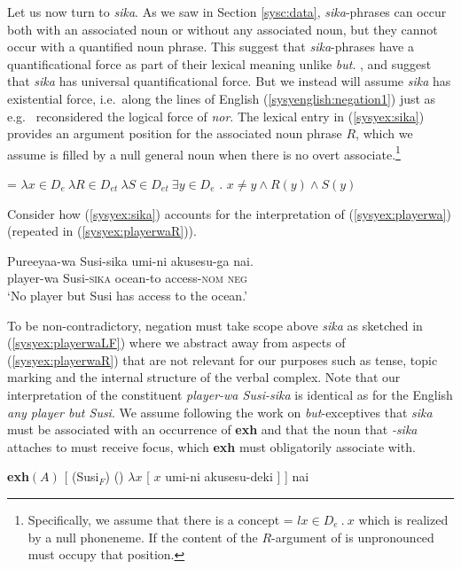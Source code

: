 \documentclass[output=paper,colorlinks,citecolor=brown,
]{langscibook}
\let\l\lambda
\def\refp#1{(\ref{sy#1})}
\def\M#1{\textsc{#1}}
\begin{document}
Let us now turn to \emph{sika}.  As we saw in Section \ref{sysc:data}, \emph{sika}-phrases can occur both with an associated noun or without any associated noun, but they cannot occur with a quantified noun phrase.
This suggest that \emph{sika}-phrases have a quantificational force as part of their lexical meaning unlike \emph{but}.
\cite{alonso-ovalle04a}, \cite{kawahara08a} and \cite{yoshimura2007b} suggest that \emph{sika} has universal quantificational force.
But we instead will assume \emph{sika} has existential force, i.e.\ along the lines of English \refp{syenglish:negation1} just as e.g.\ \cite{wurmbrand08b} reconsidered the logical force of \emph{nor}.
The lexical entry in \refp{syex:sika} provides an argument position for the associated noun phrase $R$, which we assume is filled by a null general noun when there is no overt associate.\footnote{Specifically, we assume that there is a concept  = $l x \in D_e\ .\ x$ which is realized by a null phoneneme.  If the content of the $R$-argument of  is unpronounced  must occupy that position.}

\ea \label{syex:sika} 
    = $\l x \in D_e\ \l R \in D_{et}\ \l S \in D_{et}\ \exists y \in D_e$ . $x \neq y \land R(y) \land S(y)$\z

Consider how \refp{syex:sika} accounts for the interpretation of \refp{syex:playerwa} (repeated in \refp{syex:playerwaR}).

\ea \label{syex:playerwaR}
\gll Pureeyaa-wa Susi-sika umi-ni akusesu-ga nai.\\
player-wa Susi-\M{sika} ocean-{to} access-\M{nom} \M{neg}\\
\glt `No player but Susi  has access to the ocean.'\z

To be non-contradictory, negation must take scope above \emph{sika} as sketched in \refp{syex:playerwaLF} where we abstract away from  aspects of \refp{syex:playerwaR} that are not relevant for our purposes such as tense,  topic marking and the internal structure of the verbal complex.
Note that our interpretation of the constituent \emph{player-wa Susi-sika} is identical as for the English \emph{any player but Susi}.
We assume following the work on \emph{but}-exceptives that \emph{sika} must be associated with an occurrence of \textbf{exh} and that the noun that \emph{-sika} attaches to must receive focus, which \textbf{exh} must obligatorily associate with.

\ea \label{syex:playerwaLF}
    \textbf{exh}$(A)$ [   (Susi$_F$) () $\lambda x$ [ $x$ umi-ni akusesu-deki ] ] nai \z
\end{document}
